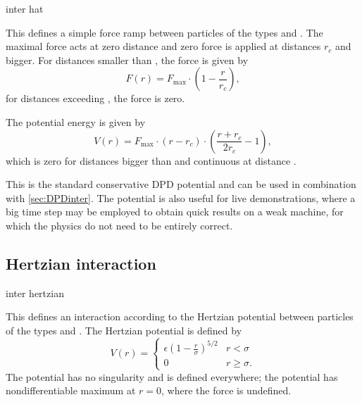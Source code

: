 \begin{essyntax}
  inter  
  hat  
  \begin{features}
  \end{features}
\end{essyntax}
This defines a simple force ramp between particles of the types  and
 . The maximal force  acts at zero distance and 
zero force is applied at distances $r_c$ and bigger. For distances smaller than 
, the force is given by
\begin{equation}
  F(r)=F_{\text{max}} \cdot \left( 1 - \frac{r}{r_c} \right),
\end{equation}
for distances exceeding , the force is zero.

The potential energy is given by
\begin{equation}
  V(r)=F_{\text{max}} \cdot (r-r_c) \cdot \left( \frac{r+r_c}{2r_c} - 1 \right),
\end{equation}
which is zero for distances bigger than  and continuous at distance 
.

This is the standard conservative DPD potential and can be used in combination 
with  \ref{sec:DPDinter}. The potential is also useful for live 
demonstrations, where a big time step may be employed to obtain quick results
on a weak machine, for which the physics do not need to be entirely correct.  

\subsection{Hertzian interaction}

\begin{essyntax}
  inter  
  hertzian \var{\epsilon} \var{\sigma}
  \begin{features}
  \end{features}
\end{essyntax}
This defines an interaction according to the Hertzian potential
between particles of the types  and . The
Hertzian potential is defined by
\begin{equation}
  V(r)=
  \begin{cases} \epsilon\left(1-\frac{r}{\sigma}\right)^{5/2} & r < \sigma\\
    0 & r \ge \sigma.
  \end{cases}
\end{equation}
The potential has no singularity and is defined everywhere; the
potential has nondifferentiable maximum at $r=0$, where the force is
undefined.

